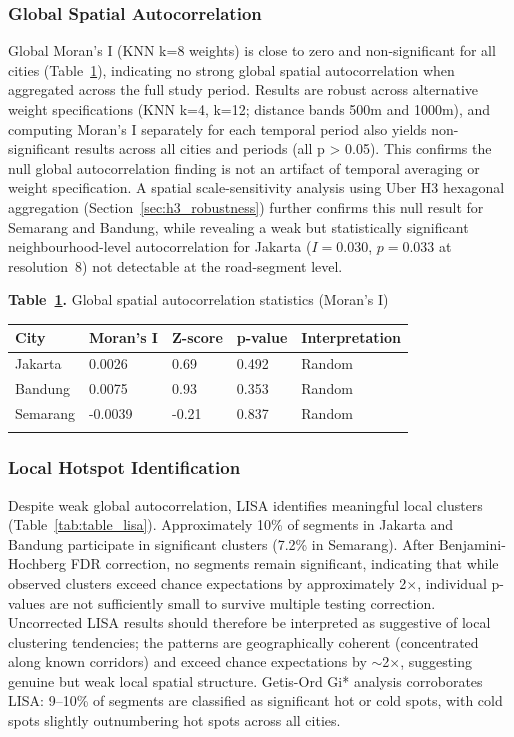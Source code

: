 \documentclass[12pt,a4paper]{article}
\begin{document}
\subsubsection{Global Spatial Autocorrelation}

Global Moran's I (KNN k=8 weights) is close to zero and non-significant for all cities (Table~\ref{tab:table_moran}), indicating no strong global spatial autocorrelation when aggregated across the full study period. Results are robust across alternative weight specifications (KNN k=4, k=12; distance bands 500m and 1000m), and computing Moran's I separately for each temporal period also yields non-significant results across all cities and periods (all p > 0.05). This confirms the null global autocorrelation finding is not an artifact of temporal averaging or weight specification. A spatial scale-sensitivity analysis using Uber H3 hexagonal aggregation (Section~\ref{sec:h3_robustness}) further confirms this null result for Semarang and Bandung, while revealing a weak but statistically significant neighbourhood-level autocorrelation for Jakarta ($I = 0.030$, $p = 0.033$ at resolution~8) not detectable at the road-segment level.

\textbf{Table~\ref{tab:table_moran}.} Global spatial autocorrelation statistics (Moran's I)

\begin{longtable}[]{@{}lllll@{}}
\toprule\noalign{}
City & Moran's I & Z-score & p-value & Interpretation \\
\midrule\noalign{}
\endhead
\bottomrule\noalign{}
\endlastfoot
Jakarta & 0.0026 & 0.69 & 0.492 & Random \\
Bandung & 0.0075 & 0.93 & 0.353 & Random \\
Semarang & -0.0039 & -0.21 & 0.837 & Random \\
\label{tab:table_moran}
\end{longtable}

\subsubsection{Local Hotspot Identification}

Despite weak global autocorrelation, LISA identifies meaningful local clusters (Table~\ref{tab:table_lisa}). Approximately 10\% of segments in Jakarta and Bandung participate in significant clusters (7.2\% in Semarang). After Benjamini-Hochberg FDR correction, no segments remain significant, indicating that while observed clusters exceed chance expectations by approximately 2$\times$, individual p-values are not sufficiently small to survive multiple testing correction. Uncorrected LISA results should therefore be interpreted as suggestive of local clustering tendencies; the patterns are geographically coherent (concentrated along known corridors) and exceed chance expectations by $\sim$2$\times$, suggesting genuine but weak local spatial structure. Getis-Ord Gi* analysis corroborates LISA: 9--10\% of segments are classified as significant hot or cold spots, with cold spots slightly outnumbering hot spots across all cities.
\end{document}
